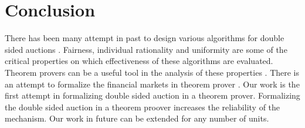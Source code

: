 \documentclass[a4paper,UKenglish,cleveref, autoref]{lipics-v2019}
\begin{document}
\section{Conclusion}
There has been many attempt in past to design various algorithms for double sided auctions \cite{Deshmukh:2002:TCD}. Fairness, individual rationality and uniformity are some of the critical properties on which effectiveness of these algorithms are evaluated. Theorem provers can be a  useful  tool in the analysis of these properties \cite{oai:HAL:hal-01673716v1, standLib}. There is an attempt to formalize the financial markets in theorem prover \cite{PassmoreI17}. Our work is the first attempt in formalizing double sided auction in a theorem prover. Formalizing the double sided auction in a theorem proover increases the reliability of the mechanism. Our work in future can be extended for any number of units.  



\end{document}
